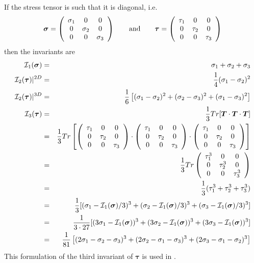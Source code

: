 If the stress tensor is such that it is diagonal, i.e.
\[
{\bm \sigma}= \left( \begin{array}{ccc}
\sigma_1 & 0 & 0 \\
0 & \sigma_2 & 0 \\
0 & 0 & \sigma_3
\end{array}\right)
\qquad
{\rm and}
\qquad
{\bm \tau}= \left( \begin{array}{ccc}
\tau_1 & 0 & 0 \\
0 & \tau_2 & 0 \\
0 & 0 & \tau_3
\end{array}\right)
\]
then the invariants are 
\begin{eqnarray}
{\cal I}_1({\bm \sigma}) &=& \sigma_1 + \sigma_2+ \sigma_3 \nonumber\\
{\cal I}_2({\bm \tau})|^{2D} &=& \frac{1}{4} (\sigma_{1} - \sigma_{2})^2 \nonumber\\
{\cal I}_2({\bm \tau})|^{3D} &=& \frac{1}{6}\left[(\sigma_{1}-\sigma_{2})^2 + (\sigma_{2}-\sigma_{3})^2 
+ (\sigma_{1}-\sigma_{3})^2 \right] \\ 
{\cal I}_3({\bm \tau}) 
&=& \frac{1}{3} Tr[{\bm T}\cdot{\bm T}\cdot {\bm T}]  \nonumber\\
&=& \frac{1}{3} Tr
\left[
\left(
\begin{array}{ccc}
\tau_1 & 0 & 0 \\
0 & \tau_2 & 0 \\
0 & 0 & \tau_3 
\end{array}
\right)
\cdot
\left(
\begin{array}{ccc}
\tau_1 & 0 & 0 \\
0 & \tau_2 & 0 \\
0 & 0 & \tau_3 
\end{array}
\right)
\cdot
\left(
\begin{array}{ccc}
\tau_1 & 0 & 0 \\
0 & \tau_2 & 0 \\
0 & 0 & \tau_3 
\end{array}
\right)
\right] \nonumber\\
&=&  \frac{1}{3} Tr
\left(
\begin{array}{ccc}
\tau_1^3 & 0 & 0 \\
0 & \tau_2^3 & 0 \\
0 & 0 & \tau_3^3 
\end{array}
\right) \nonumber\\
&=& \frac{1}{3}(\tau_1^3+\tau_2^3+\tau_3^3) \nonumber\\
&=&  \frac{1}{3} [ 
(\sigma_1-{\cal I}_1({\bm \sigma})/3)^3+  
(\sigma_2-{\cal I}_1({\bm \sigma})/3)^3+
(\sigma_3-{\cal I}_1({\bm \sigma})/3)^3 ]   \nonumber\\ 
&=&  \frac{1}{3\cdot 27} [ 
(3\sigma_1-{\cal I}_1({\bm \sigma}))^3+  
(3\sigma_2-{\cal I}_1({\bm \sigma}))^3+
(3\sigma_3-{\cal I}_1({\bm \sigma}))^3 ]   \nonumber\\ 
&=& \frac{1}{81}
\left[
(2\sigma_1-\sigma_2-\sigma_3)^3+
(2\sigma_2-\sigma_1-\sigma_3)^3+
(2\sigma_3-\sigma_1-\sigma_2)^3
\right] 
\label{eq:3rdinvb} 
\end{eqnarray}
This formulation of the third invariant of ${\bm \tau}$ is used in \cite{wojc18}.


